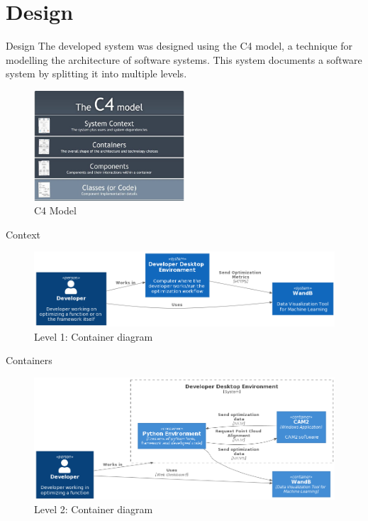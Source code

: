 \documentclass[10pt]{beamer}
\begin{document}
  \section{Design}
  \begin{frame}{Design}
    The developed system was designed using the C4 model, a technique for modelling the architecture of software systems. 
    This system documents a software system by splitting it into multiple levels.
    \begin{figure}[H]
      \centering
      \includegraphics[width=0.5\textwidth]{images/c4.jpg}
      \caption*{C4 Model}
    \end{figure}
  \end{frame}
  \begin{frame}{Context}
    \begin{figure}[H]
      \centering
      \includegraphics[width=\textwidth, keepaspectratio]{images/c1_new.png}
      \caption*{Level 1: Container diagram}
    \end{figure}
  \end{frame}
  \begin{frame}{Containers}
    \begin{figure}[H]
      \centering
      \includegraphics[width=\textwidth, keepaspectratio]{images/c2_new.png}
      \caption*{Level 2: Container diagram}
    \end{figure}
  \end{frame}
\end{document}
